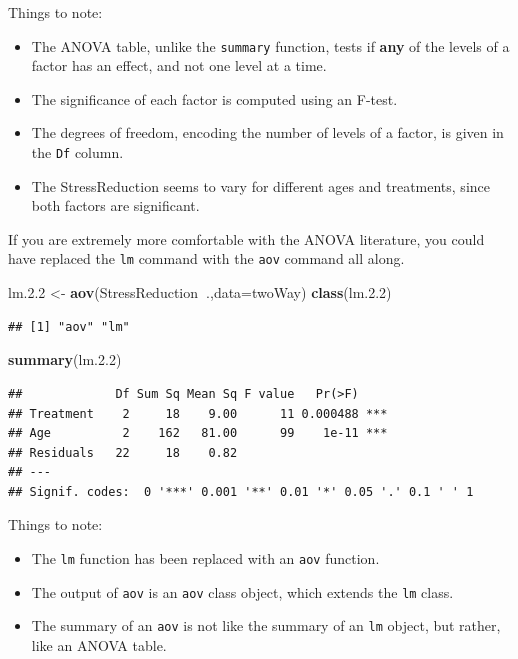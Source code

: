 \documentclass[]{book}
\newenvironment{Shaded}{\begin{snugshade}}{\end{snugshade}}
\newcommand{\DataTypeTok}[1]{\textcolor[rgb]{0.13,0.29,0.53}{#1}}
\newcommand{\FloatTok}[1]{\textcolor[rgb]{0.00,0.00,0.81}{#1}}
\newcommand{\KeywordTok}[1]{\textcolor[rgb]{0.13,0.29,0.53}{\textbf{#1}}}
\newcommand{\NormalTok}[1]{#1}
\newcommand{\OperatorTok}[1]{\textcolor[rgb]{0.81,0.36,0.00}{\textbf{#1}}}
\newcommand{\StringTok}[1]{\textcolor[rgb]{0.31,0.60,0.02}{#1}}
\providecommand{\tightlist}{%
  \setlength{\itemsep}{0pt}\setlength{\parskip}{0pt}}
\theoremstyle{definition}
\theoremstyle{definition}
\theoremstyle{definition}
\theoremstyle{remark}
\begin{document}
Things to note:

\begin{itemize}
\tightlist
\item
  The ANOVA table, unlike the \texttt{summary} function, tests if \textbf{any} of the levels of a factor has an effect, and not one level at a time.
\item
  The significance of each factor is computed using an F-test.
\item
  The degrees of freedom, encoding the number of levels of a factor, is given in the \texttt{Df} column.
\item
  The StressReduction seems to vary for different ages and treatments, since both factors are significant.
\end{itemize}

If you are extremely more comfortable with the ANOVA literature, you could have replaced the \texttt{lm} command with the \texttt{aov} command all along.

\begin{Shaded}
\begin{Highlighting}[]
\NormalTok{lm.}\FloatTok{2.2}\NormalTok{ <-}\StringTok{ }\KeywordTok{aov}\NormalTok{(StressReduction}\OperatorTok{~}\NormalTok{.,}\DataTypeTok{data=}\NormalTok{twoWay)}
\KeywordTok{class}\NormalTok{(lm.}\FloatTok{2.2}\NormalTok{)}
\end{Highlighting}
\end{Shaded}

\begin{verbatim}
## [1] "aov" "lm"
\end{verbatim}

\begin{Shaded}
\begin{Highlighting}[]
\KeywordTok{summary}\NormalTok{(lm.}\FloatTok{2.2}\NormalTok{)}
\end{Highlighting}
\end{Shaded}

\begin{verbatim}
##             Df Sum Sq Mean Sq F value   Pr(>F)    
## Treatment    2     18    9.00      11 0.000488 ***
## Age          2    162   81.00      99    1e-11 ***
## Residuals   22     18    0.82                     
## ---
## Signif. codes:  0 '***' 0.001 '**' 0.01 '*' 0.05 '.' 0.1 ' ' 1
\end{verbatim}

Things to note:

\begin{itemize}
\tightlist
\item
  The \texttt{lm} function has been replaced with an \texttt{aov} function.
\item
  The output of \texttt{aov} is an \texttt{aov} class object, which extends the \texttt{lm} class.
\item
  The summary of an \texttt{aov} is not like the summary of an \texttt{lm} object, but rather, like an ANOVA table.
\end{itemize}
\end{document}
